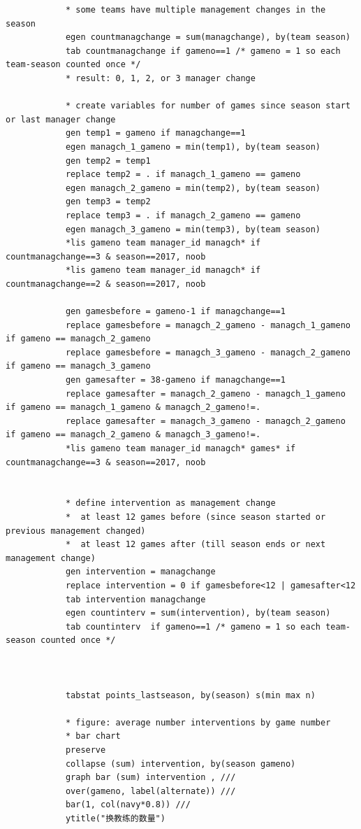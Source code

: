 \documentclass[cn,12pt,math=newtx,citestyle=gb7714-2015,bibstyle=gb7714-2015]{elegantbook}
\begin{document}
\begin{lstlisting}
	    	* some teams have multiple management changes in the season
	    	egen countmanagchange = sum(managchange), by(team season)
	    	tab countmanagchange if gameno==1 /* gameno = 1 so each team-season counted once */
	    	* result: 0, 1, 2, or 3 manager change 
	    	
	    	* create variables for number of games since season start or last manager change
	    	gen temp1 = gameno if managchange==1
	    	egen managch_1_gameno = min(temp1), by(team season)
	    	gen temp2 = temp1
	    	replace temp2 = . if managch_1_gameno == gameno
	    	egen managch_2_gameno = min(temp2), by(team season)
	    	gen temp3 = temp2
	    	replace temp3 = . if managch_2_gameno == gameno
	    	egen managch_3_gameno = min(temp3), by(team season)
	    	*lis gameno team manager_id managch* if countmanagchange==3 & season==2017, noob
	    	*lis gameno team manager_id managch* if countmanagchange==2 & season==2017, noob
	    	
	    	gen gamesbefore = gameno-1 if managchange==1
	    	replace gamesbefore = managch_2_gameno - managch_1_gameno if gameno == managch_2_gameno
	    	replace gamesbefore = managch_3_gameno - managch_2_gameno if gameno == managch_3_gameno
	    	gen gamesafter = 38-gameno if managchange==1
	    	replace gamesafter = managch_2_gameno - managch_1_gameno if gameno == managch_1_gameno & managch_2_gameno!=.
	    	replace gamesafter = managch_3_gameno - managch_2_gameno if gameno == managch_2_gameno & managch_3_gameno!=.
	    	*lis gameno team manager_id managch* games* if countmanagchange==3 & season==2017, noob
	    	
	    	
	    	* define intervention as management change 
	    	*  at least 12 games before (since season started or previous management changed)
	    	*  at least 12 games after (till season ends or next management change)
	    	gen intervention = managchange 
	    	replace intervention = 0 if gamesbefore<12 | gamesafter<12
	    	tab intervention managchange  
	    	egen countinterv = sum(intervention), by(team season)
	    	tab countinterv  if gameno==1 /* gameno = 1 so each team-season counted once */
	    	
	    	
	    	
	    	tabstat points_lastseason, by(season) s(min max n)
	    	
	    	* figure: average number interventions by game number
	    	* bar chart
	    	preserve
	    	collapse (sum) intervention, by(season gameno)
	    	graph bar (sum) intervention , ///
	    	over(gameno, label(alternate)) ///
	    	bar(1, col(navy*0.8)) ///
	    	ytitle("换教练的数量") 
	    	
	    \end{lstlisting}
	    
\end{document}
